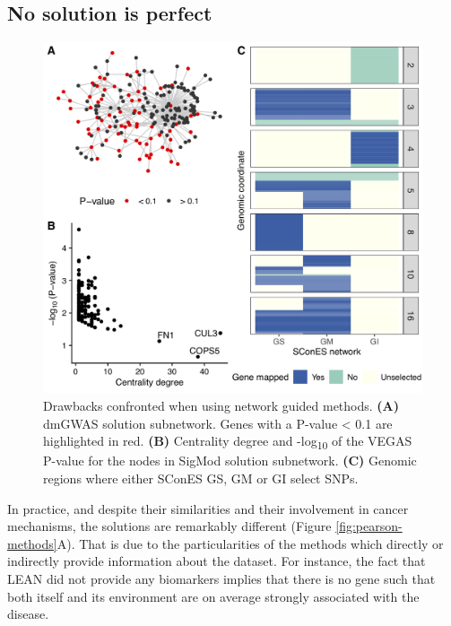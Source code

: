 \documentclass[
  11pt,
]{env/yjiao}
\begin{document}
\hypertarget{genesis-issues}{%
\subsection{No solution is perfect}\label{genesis-issues}}



\begin{figure}
\centering
\includegraphics{fig/figure_2.png}
\caption{\label{fig:issues}Drawbacks confronted when using network guided methods. \textbf{(A)} dmGWAS solution subnetwork. Genes with a P-value \textless{} 0.1 are highlighted in red. \textbf{(B)} Centrality degree and -log\textsubscript{10} of the VEGAS P-value for the nodes in SigMod solution subnetwork. \textbf{(C)} Genomic regions where either SConES GS, GM or GI select SNPs.}
\end{figure}

In practice, and despite their similarities and their involvement in
cancer mechanisms, the solutions are remarkably different
(Figure \ref{fig:pearson-methods}A). That is due to the particularities
of the methods which directly or indirectly provide information about
the dataset. For instance, the fact that LEAN did not provide any
biomarkers implies that there is no gene such that both itself and its
environment are on average strongly associated with the disease.
\end{document}
